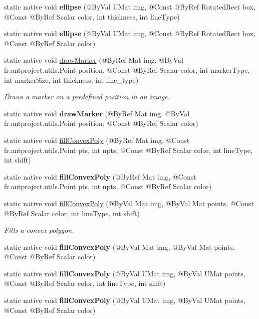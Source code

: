 \begin{DoxyCompactItemize}
\item 
static native void {\bfseries ellipse} (@By\+Val U\+Mat img, @Const @By\+Ref Rotated\+Rect box, @Const @By\+Ref Scalar color, int thickness, int line\+Type)
\item 
static native void {\bfseries ellipse} (@By\+Val U\+Mat img, @Const @By\+Ref Rotated\+Rect box, @Const @By\+Ref Scalar color)
\item 
static native void \hyperlink{group__imgproc__draw_gaedc7348c70c6b2c486689107ee346af3}{draw\+Marker} (@By\+Ref Mat img, @By\+Val fr.antproject.utils.Point position, @Const @By\+Ref Scalar color, int marker\+Type, int marker\+Size, int thickness, int line\+\_\+type)
\begin{DoxyCompactList}\small\item\em Draws a marker on a predefined position in an image. \end{DoxyCompactList}\item 
static native void {\bfseries draw\+Marker} (@By\+Ref Mat img, @By\+Val fr.antproject.utils.Point position, @Const @By\+Ref Scalar color)
\item 
static native void \hyperlink{group__imgproc__draw_ga825cdf4013e0a71e60022826a5d47037}{fill\+Convex\+Poly} (@By\+Ref Mat img, @Const fr.antproject.utils.Point pts, int npts, @Const @By\+Ref Scalar color, int line\+Type, int shift)
\item 
static native void {\bfseries fill\+Convex\+Poly} (@By\+Ref Mat img, @Const fr.antproject.utils.Point pts, int npts, @Const @By\+Ref Scalar color)
\item 
static native void \hyperlink{group__imgproc__draw_gadde734279c0c012260b7bf8a33f44fff}{fill\+Convex\+Poly} (@By\+Val Mat img, @By\+Val Mat points, @Const @By\+Ref Scalar color, int line\+Type, int shift)
\begin{DoxyCompactList}\small\item\em Fills a convex polygon. \end{DoxyCompactList}\item 
static native void {\bfseries fill\+Convex\+Poly} (@By\+Val Mat img, @By\+Val Mat points, @Const @By\+Ref Scalar color)
\item 
static native void {\bfseries fill\+Convex\+Poly} (@By\+Val U\+Mat img, @By\+Val U\+Mat points, @Const @By\+Ref Scalar color, int line\+Type, int shift)
\item 
static native void {\bfseries fill\+Convex\+Poly} (@By\+Val U\+Mat img, @By\+Val U\+Mat points, @Const @By\+Ref Scalar color)
\item 

\end{DoxyCompactItemize}

